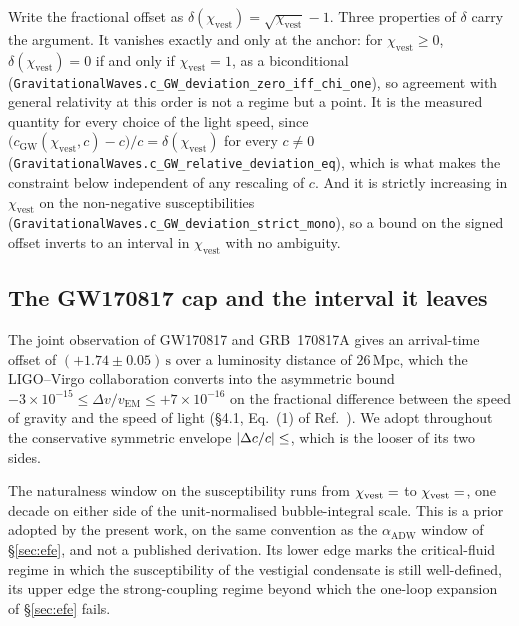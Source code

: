 \documentclass[aps,prd,nofootinbib,superscriptaddress,12pt]{revtex4-2}
\DeclareRobustCommand{\lb}{\discretionary{}{}{}}
\begin{document}
Write the fractional offset as
$\delta(\chi_{\mathrm{vest}}) = \sqrt{\chi_{\mathrm{vest}}} - 1$. Three
properties of $\delta$ carry the argument. It vanishes exactly and only
at the anchor: for $\chi_{\mathrm{vest}} \ge 0$,
$\delta(\chi_{\mathrm{vest}}) = 0$ if and only if
$\chi_{\mathrm{vest}} = 1$, as a biconditional
(\texttt{Gravitational\lb{}Waves.\lb{}c\_\lb{}GW\_\lb{}deviation\_\lb{}zero\_\lb{}iff\_\lb{}chi\_\lb{}one}), so
agreement with general relativity at this order is not a regime but a
point. It is the measured quantity for every choice of the light speed,
since
$\bigl(c_{\mathrm{GW}}(\chi_{\mathrm{vest}},c) - c\bigr)/c
= \delta(\chi_{\mathrm{vest}})$ for every $c \neq 0$
(\texttt{Gravitational\lb{}Waves.\lb{}c\_\lb{}GW\_\lb{}relative\_\lb{}deviation\_\lb{}eq}), which is
what makes the constraint below independent of any rescaling of $c$. And
it is strictly increasing in $\chi_{\mathrm{vest}}$ on the non-negative
susceptibilities
(\texttt{Gravitational\lb{}Waves.\lb{}c\_\lb{}GW\_\lb{}deviation\_\lb{}strict\_\lb{}mono}), so a bound
on the signed offset inverts to an interval in $\chi_{\mathrm{vest}}$
with no ambiguity.

\subsection{The GW170817 cap and the interval it leaves}
\label{sec:vestigial-ligo}

The joint observation of GW170817 and GRB~170817A gives an arrival-time
offset of $(+1.74 \pm 0.05)\,\mathrm{s}$ over a luminosity distance of
$26\,\mathrm{Mpc}$, which the LIGO--Virgo collaboration converts into the
asymmetric bound
$-3\times 10^{-15} \le \Delta v/v_{\mathrm{EM}} \le +7 \times 10^{-16}$
on the fractional difference between the speed of gravity and the speed
of light (\S4.1, Eq.~(1) of Ref.~\cite{Abbott2017GW170817}). We adopt
throughout the conservative symmetric envelope
$|\Delta c/c| \le \unskip$,
which is the looser of its two sides.

The naturalness window on the susceptibility runs from
$\chi_{\mathrm{vest}} = \unskip$
to
$\chi_{\mathrm{vest}} = \unskip$,
one decade on either side of the unit-normalised bubble-integral scale.
This is a prior adopted by the present work, on the same convention as
the $\alpha_{\mathrm{ADW}}$ window of \S\ref{sec:efe}, and not a
published derivation. Its lower edge marks the critical-fluid regime in
which the susceptibility of the vestigial condensate is still
well-defined, its upper edge the strong-coupling regime beyond which the
one-loop expansion of \S\ref{sec:efe} fails.
\end{document}
